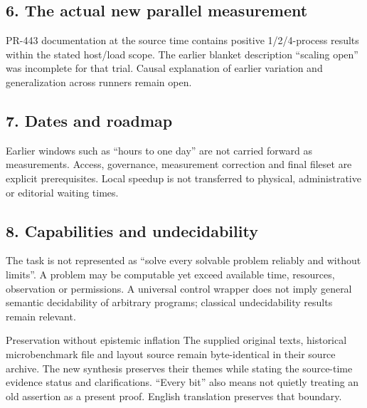 \begin{cols}
\subsection*{6. The actual new parallel measurement}
PR-443 documentation at the source time contains positive 1/2/4-process results within the stated host/load scope. The earlier blanket description ``scaling open'' was incomplete for that trial. Causal explanation of earlier variation and generalization across runners remain open.

\subsection*{7. Dates and roadmap}
Earlier windows such as ``hours to one day'' are not carried forward as measurements. Access, governance, measurement correction and final fileset are explicit prerequisites. Local speedup is not transferred to physical, administrative or editorial waiting times.

\subsection*{8. Capabilities and undecidability}
The task is not represented as ``solve every solvable problem reliably and without limits''. A problem may be computable yet exceed available time, resources, observation or permissions. A universal control wrapper does not imply general semantic decidability of arbitrary programs; classical undecidability results remain relevant. 

\begin{boundary}{Preservation without epistemic inflation}
The supplied original texts, historical microbenchmark file and layout source remain byte-identical in their source archive. The new synthesis preserves their themes while stating the source-time evidence status and clarifications. ``Every bit'' also means not quietly treating an old assertion as a present proof. English translation preserves that boundary.
\end{boundary}
\end{cols}

